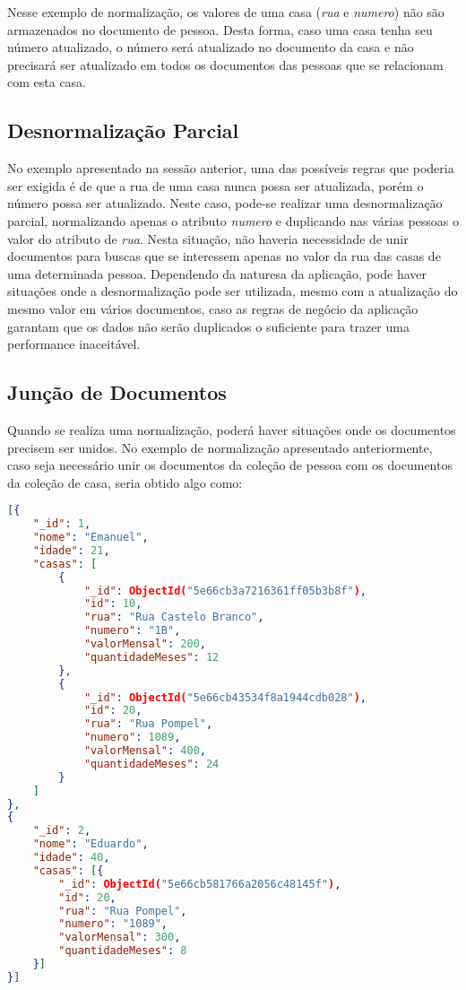 Nesse exemplo de normalização, os valores de uma casa (\textit{rua} e \textit{numero}) não são armazenados no documento de pessoa. Desta forma, caso uma casa tenha seu número atualizado, o número será atualizado no documento da casa e não precisará ser atualizado em todos os documentos das pessoas que se relacionam com esta casa.

\subsection{Desnormalização Parcial}
    
No exemplo apresentado na sessão anterior, uma das possíveis regras que poderia ser exigida é de que a rua de uma casa nunca possa ser atualizada, porém o número possa ser atualizado. Neste caso, pode-se realizar uma desnormalização parcial, normalizando apenas o atributo \textit{numero} e duplicando nas várias pessoas o valor do atributo de \textit{rua}. Nesta situação, não haveria necessidade de unir documentos para buscas que se interessem apenas no valor da rua das casas de uma determinada pessoa. Dependendo da naturesa da aplicação, pode haver situações onde a desnormalização pode ser utilizada, mesmo com a atualização do mesmo valor em vários documentos, caso as regras de negócio da aplicação garantam que os dados não serão duplicados o suficiente para trazer uma performance inaceitável.

\subsection{Junção de Documentos}
    
Quando se realiza uma normalização, poderá haver situações onde os documentos precisem ser unidos. No exemplo de normalização apresentado anteriormente, caso seja necessário unir os documentos da coleção de pessoa com os documentos da coleção de casa, seria obtido algo como:

\newpage

\begin{lstlisting}[language=json, caption={Junção de Documentos Normalizados}]
[{
    "_id": 1,
    "nome": "Emanuel",
    "idade": 21,
    "casas": [
        {
            "_id": ObjectId("5e66cb3a7216361ff05b3b8f"),
            "id": 10,
            "rua": "Rua Castelo Branco",
            "numero": "1B",
            "valorMensal": 200,
            "quantidadeMeses": 12
        },
        {
            "_id": ObjectId("5e66cb43534f8a1944cdb028"),
            "id": 20,
            "rua": "Rua Pompel",
            "numero": 1089,
            "valorMensal": 400,
            "quantidadeMeses": 24
        }
    ]
},
{
    "_id": 2,
    "nome": "Eduardo",
    "idade": 40,
    "casas": [{
        "_id": ObjectId("5e66cb581766a2056c48145f"),
        "id": 20,
        "rua": "Rua Pompel",
        "numero": "1089",
        "valorMensal": 300,
        "quantidadeMeses": 8
    }]
}]
\end{lstlisting}

